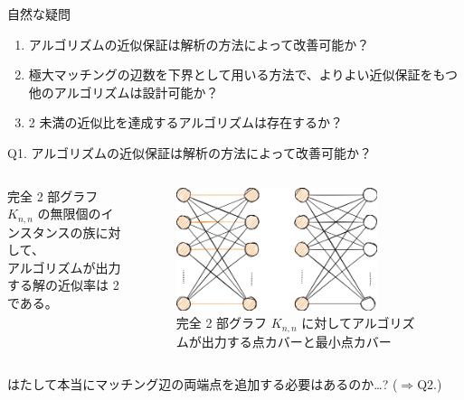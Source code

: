 \documentclass[aspectratio=169]{beamer}
\begin{document}
\begin{frame}{自然な疑問 \cite{vazirani2010}}
	\begin{enumerate}
		\item アルゴリズムの近似保証は解析の方法によって改善可能か？
		\item 極大マッチングの辺数を下界として用いる方法で、よりよい近似保証をもつ\\他のアルゴリズムは設計可能か？
		\item 2 未満の近似比を達成するアルゴリズムは存在するか？
	\end{enumerate}
\end{frame}

\begin{frame}{Q1. アルゴリズムの近似保証は解析の方法によって改善可能か？}

	\begin{example}
		\begin{columns}
			\begin{column}{0.5\textwidth}
				完全 2 部グラフ \(K_{n, n}\) の無限個のインスタンスの族に対して、\\
				アルゴリズムが出力する解の近似率は 2 である。
			\end{column}
			\begin{column}{0.5\textwidth}
				\begin{figure}
					\centering
					\includegraphics[width=0.8\textwidth]{figures/complete-bipertitle.png}
					\caption{完全 2 部グラフ \(K_{n, n}\) に対してアルゴリズムが出力する点カバーと最小点カバー}
				\end{figure}
			\end{column}
		\end{columns}
	\end{example}

	\alert{はたして本当にマッチング辺の両端点を追加する必要はあるのか\dots{}? (\(\Rightarrow\)Q2.)}
\end{frame}
\end{document}
